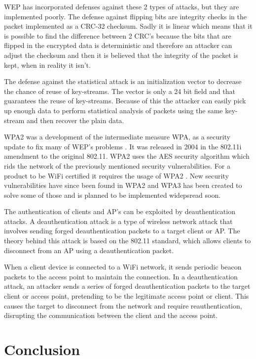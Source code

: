 WEP has incorporated defenses against these 2 types of attacks, but they are implemented poorly. The defense against flipping bits are integrity checks in the packet implemented as a CRC-32 checksum. Sadly it is linear which means that it is possible to find the difference between 2 CRC's because the bits that are flipped in the encrypted data is deterministic and therefore an attacker can adjust the checksum and then it is believed that the integrity of the packet is kept, when in reality it isn't.

The defense against the statistical attack is an initialization vector to decrease the chance of reuse of key-streams. The vector is only a 24 bit field and that guarantees the reuse of key-streams. Because of this the attacker can easily pick up enough data to perform statistical analysis of packets using the same key-stream and then recover the plain data.

WPA2 was a development of the intermediate measure WPA, as a security update to fix many of WEP's problems \cite{WPA2_1}. It was released in 2004 in the 802.11i amendment to the original 802.11. WPA2 uses the AES security algorithm which rids the network of the previously mentioned security vulnerabilities. For a product to be WiFi certified it requires the usage of WPA2 \cite{WPA2_2}. New security vulnerabilities have since been found in WPA2 and WPA3 has been created to solve some of those and is planned to be implemented widepsread soon.

The authentication of clients and AP's can be exploited by deauthentication attacks. A deauthentication attack is a type of wireless network attack that involves sending forged deauthentication packets to a target client or AP. The theory behind this attack is based on the 802.11 standard, which allows clients to disconnect from an AP using a deauthentication packet.

When a client device is connected to a WiFi network, it sends periodic beacon packets to the access point to maintain the connection. In a deauthentication attack, an attacker sends a series of forged deauthentication packets to the target client or access point, pretending to be the legitimate access point or client. This causes the target to disconnect from the network and require reauthentication, disrupting the communication between the client and the access point.




\section{Conclusion}

